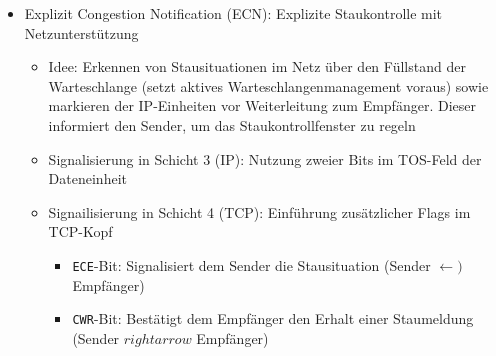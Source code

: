 \begin{itemize}
\begin{itemize}
\begin{enumerate}
\begin{itemize}
\begin{itemize}
				\end{itemize}
			\end{itemize}
		\end{enumerate}
		\item Explizit Congestion Notification (ECN): Explizite Staukontrolle mit Netzunterstützung
		\begin{itemize}
			\item Idee: Erkennen von Stausituationen im Netz über den Füllstand der Warteschlange (setzt aktives Warteschlangenmanagement voraus) sowie markieren der IP-Einheiten vor Weiterleitung zum Empfänger. Dieser informiert den Sender, um das Staukontrollfenster zu regeln
			\item Signalisierung in Schicht 3 (IP): Nutzung zweier Bits im TOS-Feld der Dateneinheit
			\item Signailisierung in Schicht 4 (TCP): Einführung zusätzlicher Flags im TCP-Kopf
			\begin{itemize}
				\item \texttt{ECE}-Bit: Signalisiert dem Sender die Stausituation (Sender \(\leftarrow)\) Empfänger)
				\item \texttt{CWR}-Bit: Bestätigt dem Empfänger den Erhalt einer Staumeldung (Sender \(rightarrow\) Empfänger)
			\end{itemize}
		\end{itemize}
	\end{itemize}
\end{itemize}

